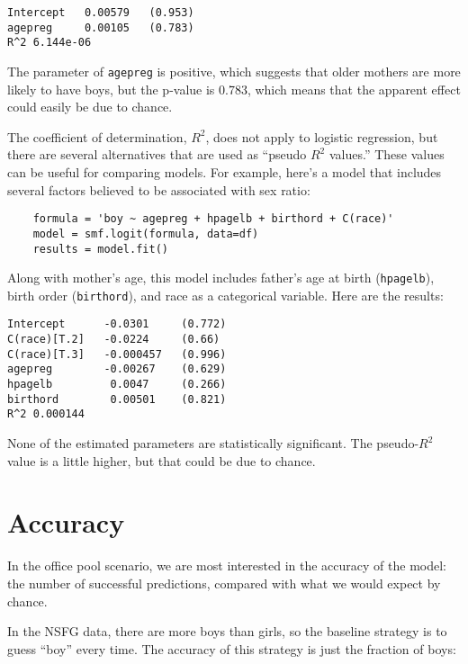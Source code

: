 \begin{verbatim}
Intercept   0.00579   (0.953)
agepreg     0.00105   (0.783)
R^2 6.144e-06
\end{verbatim}

The parameter of {\tt agepreg} is positive, which suggests that
older mothers are more likely to have boys, but the p-value is
0.783, which means that the apparent effect could easily be due
to chance.

The coefficient of determination, $R^2$, does not apply to logistic
regression, but there are several alternatives that are used
as ``pseudo $R^2$ values.''  These values can be useful for comparing
models.  For example, here's a model that includes several factors
believed to be associated with sex ratio:

\begin{verbatim}
    formula = 'boy ~ agepreg + hpagelb + birthord + C(race)'
    model = smf.logit(formula, data=df)
    results = model.fit()
\end{verbatim}

Along with mother's age, this model includes father's age at
birth ({\tt hpagelb}), birth order ({\tt birthord}), and
race as a categorical variable.  Here are the results:

\begin{verbatim}
Intercept      -0.0301     (0.772)
C(race)[T.2]   -0.0224     (0.66)
C(race)[T.3]   -0.000457   (0.996)
agepreg        -0.00267    (0.629)
hpagelb         0.0047     (0.266)
birthord        0.00501    (0.821)
R^2 0.000144
\end{verbatim}

None of the estimated parameters are statistically significant.  The
pseudo-$R^2$ value is a little higher, but that could be due to
chance.
   


\section{Accuracy}
\label{accuracy}

In the office pool scenario,
we are most interested in the accuracy of the model:
the number of successful predictions, compared with what we would
expect by chance.

In the NSFG data, there are more boys than girls, so the baseline
strategy is to guess ``boy'' every time.  The accuracy of this
strategy is just the fraction of boys:

